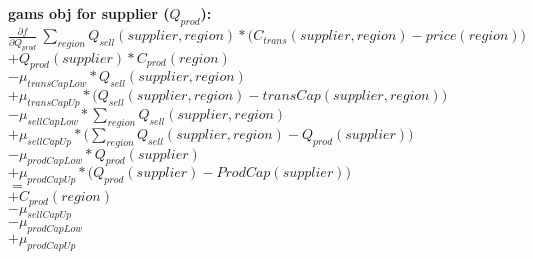 \documentclass{article}
\begin{document}
\textbf{gams obj for supplier ($Q_{prod}$):}\\
$\frac{\partial f}{\partial Q_{prod}} \:\sum_{region} Q_{sell}(supplier, region) *\Big(C_{trans}(supplier,region) - price(region)\Big)$\\
$+ Q_{prod}(supplier)*C_{prod}(region)$\\
$-\mu_{transCapLow} * Q_{sell}(supplier, region)$\\
$+\mu_{transCapUp} *\Big( Q_{sell}(supplier, region) - transCap(supplier, region)\Big)$\\
$-\mu_{sellCapLow} * \sum_{region} Q_{sell}(supplier, region)$\\
$+\mu_{sellCapUp}*\Big(\sum_{region} Q_{sell}(supplier, region) -  Q_{prod}(supplier) \Big) $\\
$-\mu_{prodCapLow} * Q_{prod}(supplier)$\\
$+\mu_{prodCapUp}*\Big(Q_{prod}(supplier) - ProdCap(supplier)\Big)$\\
$=$\\
$+C_{prod}(region)$\\
$-\mu_{sellCapUp}$\\
$-\mu_{prodCapLow}$\\
$+\mu_{prodCapUp}$\\
\end{document}
